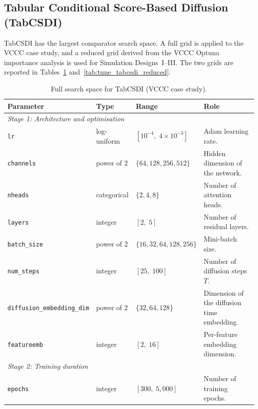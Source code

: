 \subsection{Tabular Conditional Score-Based Diffusion (TabCSDI)}

TabCSDI has the largest comparator search space. A full grid is applied to the VCCC case study, and a reduced grid derived from the VCCC Optuna importance analysis is used for Simulation Designs~I--III. The two grids are reported in Tables~\ref{tab:tune_tabcsdi_full} and~\ref{tab:tune_tabcsdi_reduced}.

\begin{table}[ht]
\centering
\caption{Full search space for TabCSDI (VCCC case study).}
\label{tab:tune_tabcsdi_full}
\begin{tabularx}{\textwidth}{lll>{\raggedright\arraybackslash}X}
\toprule
Parameter & Type & Range & Role \\
\midrule
\multicolumn{4}{l}{\textit{Stage 1: Architecture and optimisation}} \\
\texttt{lr} & log-uniform & $[10^{-4},\; 4 \times 10^{-3}]$ &
    Adam learning rate. \\
\texttt{channels} & power of 2 & $\{64, 128, 256, 512\}$ &
    Hidden dimension of the network. \\
\texttt{nheads} & categorical & $\{2, 4, 8\}$ &
    Number of attention heads. \\
\texttt{layers} & integer & $[2,\; 5]$ &
    Number of residual layers. \\
\texttt{batch\_size} & power of 2 & $\{16, 32, 64, 128, 256\}$ &
    Mini-batch size. \\
\texttt{num\_steps} & integer & $[25,\; 100]$ &
    Number of diffusion steps $T$. \\
\texttt{diffusion\_embedding\_dim} & power of 2 & $\{32, 64, 128\}$ &
    Dimension of the diffusion time embedding. \\
\texttt{featureemb} & integer & $[2,\; 16]$ &
    Per-feature embedding dimension. \\
\midrule
\multicolumn{4}{l}{\textit{Stage 2: Training duration}} \\
\texttt{epochs} & integer & $[300,\; 5{,}000]$ &
    Number of training epochs. \\
\bottomrule
\end{tabularx}
\end{table}

